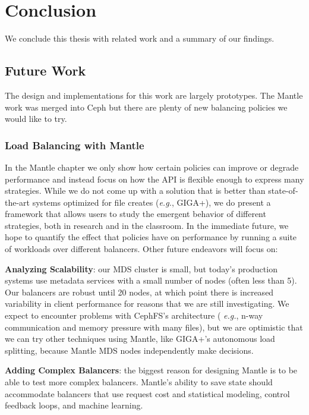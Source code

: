 \chapter{Conclusion}
\label{chp:conclusion}

We conclude this thesis with related work and a summary of our findings.

\section{Future Work}

The design and implementations for this work are largely prototypes. The Mantle
work was merged into Ceph but there are plenty of new balancing policies we
would like to try.

\subsection{Load Balancing with Mantle}

In the Mantle chapter we only show how certain policies can improve or degrade
performance and instead focus on how the API is flexible enough to express many
strategies.  While we do not come up with a solution that is better than
state-of-the-art systems optimized for file creates ({\it e.g.}, GIGA+), we do
present a framework that allows users to study the emergent behavior of
different strategies, both in research and in the classroom. In the immediate
future, we hope to quantify the effect that policies have on performance by
running a suite of workloads over different balancers. Other future endeavors
will focus on:

\textbf{Analyzing Scalability}: our MDS cluster is small, but today's
production systems use metadata services with a small number of nodes (often
less than 5). Our balancers are robust until 20 nodes, at which point there is
increased variability in client performance for reasons that we are still
investigating. We expect to encounter problems with CephFS's architecture ({\it
e.g.}, n-way communication and memory pressure with many files), but we are
optimistic that we can try other techniques using Mantle, like GIGA+'s
autonomous load splitting, because Mantle MDS nodes independently make
decisions. 


\textbf{Adding Complex Balancers}: the biggest reason for designing Mantle is
to be able to test more complex balancers. Mantle's ability to save state
should accommodate balancers that use request cost and statistical modeling,
control feedback loops, and machine learning.

